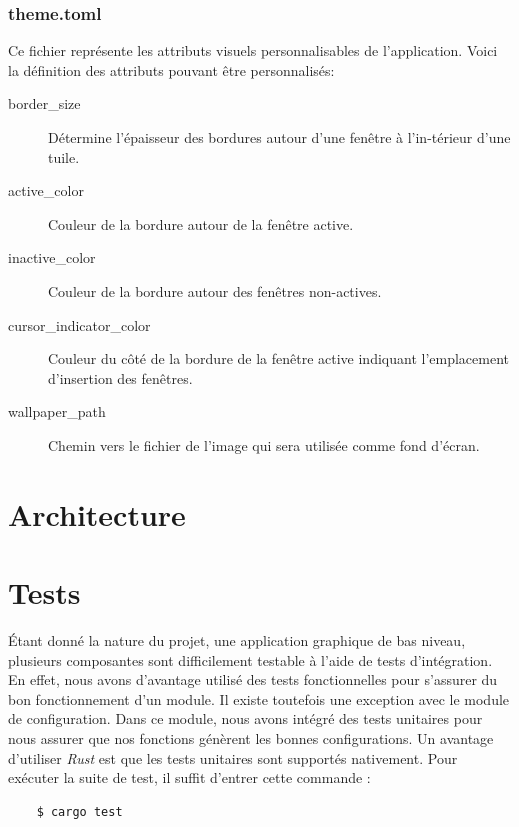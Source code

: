 \documentclass[titlepage]{article}
\begin{document}
\subsubsection{theme.toml}
\begin{minipage}{\linewidth}
	
\end{minipage}

\par
Ce fichier représente les attributs visuels personnalisables de l'application. Voici la définition des attributs pouvant être personnalisés:
\begin{description}
	\item [border\_size] Détermine l'épaisseur des bordures autour d'une fenêtre à l'in-térieur d'une tuile.
	\item [active\_color] Couleur de la bordure autour de la fenêtre active.
	\item [inactive\_color] Couleur de la bordure autour des fenêtres non-actives.
	\item [cursor\_indicator\_color] Couleur du côté de la bordure de la fenêtre active indiquant l'emplacement d'insertion des fenêtres.
	\item [wallpaper\_path] Chemin vers le fichier de l'image qui sera utilisée comme fond d'écran.
\end{description}

\section{Architecture}
\section{Tests}
Étant donné la nature du projet, une application graphique de bas niveau, plusieurs composantes sont difficilement testable à l'aide de tests d'intégration. En effet, nous avons d'avantage utilisé des tests fonctionnelles pour s'assurer du bon fonctionnement d'un module. Il existe toutefois une exception avec le module de configuration. Dans ce module, nous avons intégré des tests unitaires pour nous assurer que nos fonctions génèrent les bonnes configurations. Un avantage d'utiliser \textit{Rust} est que les tests unitaires sont supportés nativement. Pour exécuter la suite de test, il suffit d'entrer cette commande :
\begin{verbatim}
	$ cargo test
\end{verbatim}
\end{document}
